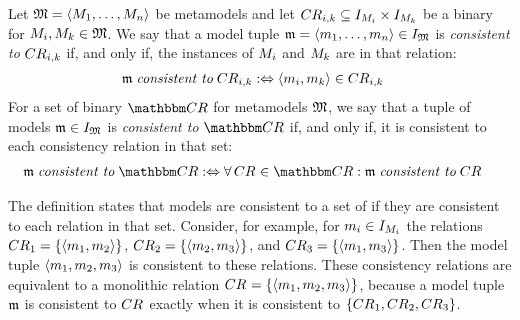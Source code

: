 \begin{definition} 
    \label{def:modellevelconsistency}
    Let $\metamodeltuple{M} =  \tupled{\metamodelsequence{M}{n}}$ be metamodels and let $\consistencyrelation{CR}{i,k} \subseteq \metamodelinstanceset{M}{i} \times \metamodelinstanceset{M}{k}$ be a binary \modellevelconsistencyrelation for $\metamodel{M}{i}, \metamodel{M}{k} \in \metamodeltuple{M}$. 
    We say that a model tuple $\modeltuple{m} = \tupled{\model{m}{1}, \dots, \model{m}{n}} \in \metamodeltupleinstanceset{M}{}$ is \emph{consistent to} $\consistencyrelation{CR}{i,k}$ if, and only if, the instances of $\metamodel{M}{i}$ and $\metamodel{M}{k}$ are in that relation:
    \begin{align*} 
        &
        \modeltuple{m} \consistenttomath \consistencyrelation{CR}{i,k} \equivalentperdefinition 
        \tupled{\model{m}{i},\model{m}{k}} \in \consistencyrelation{CR}{i,k}
    \end{align*}
    For a set of binary \modellevelconsistencyrelations $\consistencyrelationset{CR}$ for metamodels $\metamodeltuple{M}$, we say that a tuple of models $\modeltuple{m} \in \metamodeltupleinstanceset{M}{}$ is \emph{consistent to} $\consistencyrelationset{CR}$ if, and only if, it is consistent to each consistency relation in that set:
    \begin{align*} 
        &
        \modeltuple{m} \consistenttomath \consistencyrelationset{CR} \equivalentperdefinition
        \forall \consistencyrelation{CR}{} \in \consistencyrelationset{CR} : \modeltuple{m} \consistenttomath \consistencyrelation{CR}{}
    \end{align*}
\end{definition}

The definition states that models are consistent to a set of \modellevelconsistencyrelations if they are consistent to each relation in that set.
Consider, for example, for $\model{m}{i} \in \metamodelinstanceset{M}{i}$ the relations $\consistencyrelation{CR}{1} = \setted{\tupled{\model{m}{1}, \model{m}{2}}}$, $\consistencyrelation{CR}{2} = \setted{\tupled{\model{m}{2},\model{m}{3}}}$, and $\consistencyrelation{CR}{3} = \setted{\tupled{\model{m}{1}, \model{m}{3}}}$. Then the model tuple $\tupled{\model{m}{1}, \model{m}{2}, \model{m}{3}}$ is consistent to these relations.
These consistency relations are equivalent to a monolithic relation $\consistencyrelation{CR}{} = \setted{\tupled{\model{m}{1}, \model{m}{2}, \model{m}{3}}}$, because a model tuple $\modeltuple{m}$ is consistent to $\consistencyrelation{CR}{}$ exactly when it is consistent to $\setted{\consistencyrelation{CR}{1}, \consistencyrelation{CR}{2}, \consistencyrelation{CR}{3}}$.

